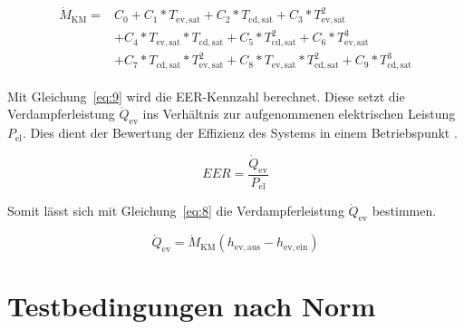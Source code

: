 \begin{align}
\label{eq:7}
	\begin{split}
	\dot{M}_{\mathrm{KM}} = &C_0 + C_1*T_{\mathrm{ev,sat}} + C_2*T_{\mathrm{cd,sat}} + C_3*T_{\mathrm{ev,sat}}^2 \\
	&+C_4*T_{\mathrm{ev,sat}}*T_{\mathrm{cd,sat}} + C_5*T_{\mathrm{cd,sat}}^2 + C_6*T_{\mathrm{ev,sat}}^3 \\
	&+ C_7*T_{\mathrm{cd,sat}}*T_{\mathrm{ev,sat}}^2 +C_8*T_{\mathrm{ev,sat}}*T_{\mathrm{cd,sat}}^2 + C_9*T_{\mathrm{cd,sat}}^3
	\end{split}
\end{align}

Mit Gleichung~\ref{eq:9} wird die EER-Kennzahl berechnet. Diese setzt die Verdampferleistung  $\dot{Q}_{\mathrm{ev}}$ ins Verhältnis zur aufgenommenen elektrischen Leistung $P_{\mathrm{el}}$. Dies dient der Bewertung der Effizienz des Systems in einem Betriebspunkt \cite{Muller.2016}.


\begin{equation}
\label{eq:9}
EER = \frac{\dot{Q}_{\mathrm{ev}}}{P_{\mathrm{el}}}
\end{equation}

Somit lässt sich mit Gleichung~\ref{eq:8} die Verdampferleistung $\dot{Q}_{\mathrm{ev}}$ bestimmen.

\begin{equation}
\label{eq:8}
\dot{Q}_{\mathrm{ev}}= \dot{M}_{\mathrm{KM}}(h_{\mathrm{ev,aus}} - h_{\mathrm{ev,ein}})
\end{equation}




\section{Testbedingungen nach Norm}
\label{sec:Testbedingungen nach Norm}

